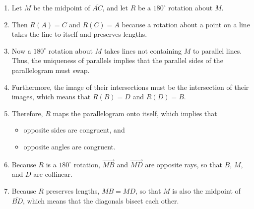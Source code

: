 \documentclass[nooutcomes]{ximera}
\begin{document}
\begin{problem}
\begin{enumerate}
\item Let $M$ be the midpoint of $\overline{AC}$, and let $R$ be a $180^\circ$ rotation about $M$.  
\item Then $R(A)=C$ and $R(C)=A$ because a rotation about a point on a line takes the line to itself and preserves lengths.
\item Now a $180^\circ$ rotation about $M$ takes lines not containing $M$ to parallel lines.  Thus, the uniqueness of parallels implies that the parallel sides of the parallelogram must swap.  
\item Furthermore, the image of their intersections must be the intersection of their images, which means that $R(B)=D$ and $R(D)=B$.  
\item Therefore, $R$ maps the parallelogram onto itself, which implies that
\begin{itemize}
\item opposite sides are congruent, and 
\item opposite angles are congruent.  
\end{itemize}
\item Because $R$ is a $180^\circ$ rotation, $\overrightarrow{MB}$ and $\overrightarrow{MD}$ are opposite rays, so that $B$, $M$, and $D$ are collinear.  
\item Because $R$ preserves lengths, $MB=MD$, so that $M$ is also the midpoint of $\overline{BD}$, which means that the diagonals bisect each other.
\end{enumerate}

\end{problem}
\end{document}
